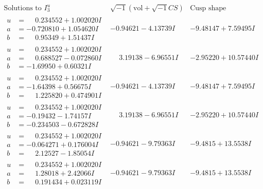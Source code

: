 \documentclass[1p]{elsarticle_modified}
\theoremstyle{definition}
\newcommand{\I}{\sqrt{-1}}
\begin{document}
$$\begin{array}{c|c|c}  
\text{Solutions to }I^u_{3}& \I (\text{vol} + \sqrt{-1}CS) & \text{Cusp shape}\\
 \hline 
\begin{aligned}
u &= \phantom{-}0.234552 + 1.002020 I \\
a &= -0.720810 + 1.054620 I \\
b &= \phantom{-}0.95349 + 1.51437 I\end{aligned}
 & -0.94621 - 4.13739 I & -9.48147 + 7.59495 I \\ \hline\begin{aligned}
u &= \phantom{-}0.234552 + 1.002020 I \\
a &= \phantom{-}0.688527 - 0.072860 I \\
b &= -1.69950 + 0.60321 I\end{aligned}
 & \phantom{-}3.19138 - 6.96551 I & -2.95220 + 10.57440 I \\ \hline\begin{aligned}
u &= \phantom{-}0.234552 + 1.002020 I \\
a &= -1.64398 + 0.56675 I \\
b &= \phantom{-}1.225820 + 0.474901 I\end{aligned}
 & -0.94621 - 4.13739 I & -9.48147 + 7.59495 I \\ \hline\begin{aligned}
u &= \phantom{-}0.234552 + 1.002020 I \\
a &= -0.19432 - 1.74157 I \\
b &= -0.234503 - 0.672828 I\end{aligned}
 & \phantom{-}3.19138 - 6.96551 I & -2.95220 + 10.57440 I \\ \hline\begin{aligned}
u &= \phantom{-}0.234552 + 1.002020 I \\
a &= -0.064271 + 0.176004 I \\
b &= \phantom{-}2.12527 - 1.85054 I\end{aligned}
 & -0.94621 - 9.79363 I & -9.4815 + 13.5538 I \\ \hline\begin{aligned}
u &= \phantom{-}0.234552 + 1.002020 I \\
a &= \phantom{-}1.28018 + 2.42066 I \\
b &= \phantom{-}0.191434 + 0.023119 I\end{aligned}
 & -0.94621 - 9.79363 I & -9.4815 + 13.5538 I \\ \hline\begin{aligned}

\end{aligned}
\end{array}$$
\end{document}
